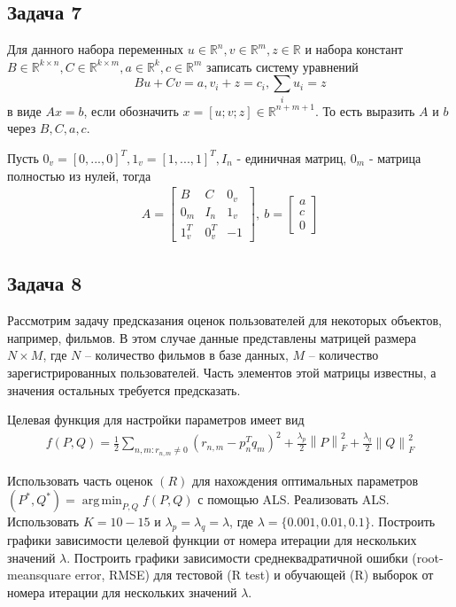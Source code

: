 \documentclass{article}
\DeclareMathOperator*{\argmin}{arg\,min}
\newcommand{\RV}[1] {\mathbb{R}^{#1}}
\newcommand{\RM}[2] {\mathbb{R}^{#1 \times #2}}
\newcommand{\norm}[1]{\left\lVert#1\right\rVert}
\begin{document}
    \subsection*{Задача 7}
    Для данного набора переменных $u \in \RV{n}, v \in \RV{m}, z \in \mathbb{R}$ и набора констант $B \in \RM{k}{n}, C \in \RM{k}{m}, a \in \RV{k}, c \in \RV{m}$ записать систему уравнений
    \begin{equation*}
        Bu + Cv = a, v_i + z = c_i, \sum_i u_i = z
    \end{equation*}
    в виде $Ax = b$, если обозначить $x = [u; v; z] \in \RV{n + m + 1}$. То есть выразить $A$ и $b$ через $B, C, a, c$.
    \bigbreak
    
    Пусть $0_v = [0, ..., 0]^T, 1_v = [1, ..., 1]^T, I_n$ - единичная матриц, $0_m$ - матрица полностью из нулей, тогда
    \begin{align*}
    A = \left[\begin{matrix}
            B & C & 0_v \\
            0_m & I_n & 1_v \\
            1_v^T & 0_v^T & -1
        \end{matrix}\right], \:
    b = \left[\begin{matrix}
            a \\
            c \\
            0
        \end{matrix}\right]
    \end{align*}
    
    \subsection*{Задача 8}
    Рассмотрим задачу предсказания оценок пользователей для некоторых объектов,
 например, фильмов. В этом случае данные представлены матрицей размера $N\times M$, где $N$ –
 количество фильмов в базе данных, $M$ – количество зарегистрированных пользователей. Часть элементов этой матрицы известны, а значения остальных требуется предсказать.
    
    Целевая функция для настройки параметров имеет вид
    \begin{align*}
        f(P, Q) = \frac{1}{2}\sum_{n, m: r_{n, m} \neq 0} (r_{n, m} - p_n^Tq_m)^2 +
        \frac{\lambda_p}{2}\norm{P}_F^2 + \frac{\lambda_q}{2}\norm{Q}_F^2 
    \end{align*}
    
    Использовать часть оценок $(R)$ для нахождения оптимальных параметров $(P^*, Q^*) =
 \argmin_{P, Q} f(P, Q)$ с помощью ALS. Реализовать ALS. Использовать $K = 10 - 15$ и $\lambda_p = \lambda_q = \lambda$, где
 $\lambda = \{0.001, 0.01, 0.1\}$. Построить графики зависимости целевой функции от номера итерации для
нескольких значений $\lambda$. Построить графики зависимости среднеквадратичной ошибки (root-meansquare error, RMSE) для тестовой (R test) и обучающей (R) выборок от номера итерации для нескольких значений $\lambda$.   
    \newpage
    
\end{document}
